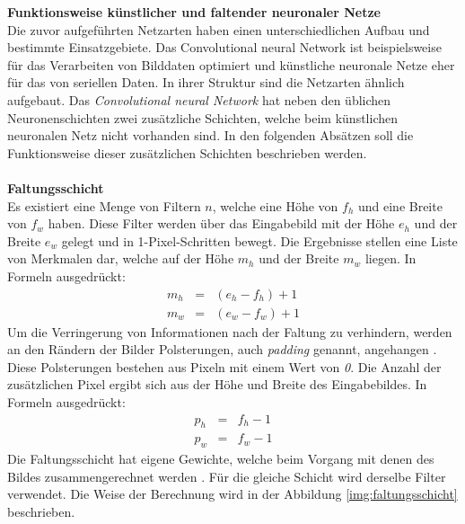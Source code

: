 \textbf{Funktionsweise künstlicher und faltender neuronaler Netze}\label{s.funktwknnundcnn}\\
Die zuvor aufgeführten Netzarten haben einen unterschiedlichen Aufbau und bestimmte Einsatzgebiete. Das Convolutional neural Network ist beispielsweise für das Verarbeiten von Bilddaten optimiert und künstliche neuronale Netze eher für das von seriellen Daten. In ihrer Struktur sind die Netzarten ähnlich aufgebaut. Das \textit{Convolutional neural Network} hat neben den üblichen Neuronenschichten zwei zusätzliche Schichten, welche beim künstlichen neuronalen Netz nicht vorhanden sind. In den folgenden Absätzen soll die Funktionsweise dieser zusätzlichen Schichten beschrieben werden\cite[343]{goodfellow2016deep}.\\\\
\textbf{Faltungsschicht}\\
Es existiert eine Menge von Filtern $n$, welche eine Höhe von $f_{h}$ und eine Breite von $f_{w}$ haben. Diese Filter werden über das Eingabebild mit der Höhe $e_{h}$ und der Breite $e_{w}$ gelegt und in 1-Pixel-Schritten bewegt. Die Ergebnisse stellen eine Liste von Merkmalen dar, welche auf der Höhe $m_{h}$ und der Breite $m_{w}$ liegen. In Formeln ausgedrückt:
\begin{eqnarray} 
m_{h}&=&(e_{h} - f_{h})+1\\
m_{w}&=&(e_{w} - f_{w})+1
\end{eqnarray}
Um die Verringerung von Informationen nach der Faltung zu verhindern, werden an den Rändern der Bilder Polsterungen, auch \textit{padding} genannt, angehangen \cite[343]{goodfellow2016deep}. Diese Polsterungen bestehen aus Pixeln mit einem Wert von \textit{0}. Die Anzahl der zusätzlichen Pixel ergibt sich aus der Höhe und Breite des Eingabebildes. In Formeln ausgedrückt:
\begin{eqnarray}
p_{h}&=&f_{h} - 1\\
p_{w}&=&f_{w} - 1
\end{eqnarray}
Die Faltungsschicht hat eigene Gewichte, welche beim Vorgang mit denen des Bildes zusammengerechnet werden \cite[331ff.]{goodfellow2016deep}. Für die gleiche Schicht wird derselbe Filter verwendet. Die Weise der Berechnung wird in der Abbildung \ref{img:faltungsschicht}  beschrieben.
